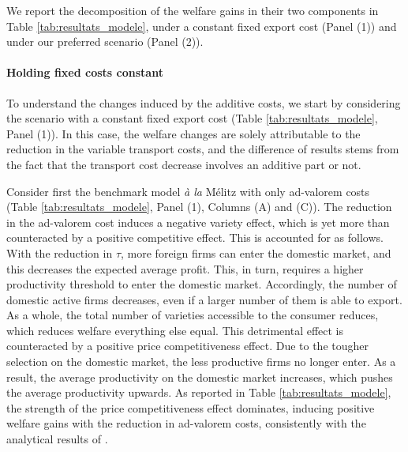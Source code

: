 \documentclass[a4paper,11pt]{article}
\begin{document}
We report the decomposition of the welfare gains in their two components in Table \ref{tab:resultats_modele}, under a constant fixed export cost (Panel (1)) and under our preferred scenario (Panel (2)). \medskip


\paragraph{Holding fixed costs constant} To understand the changes induced by the additive costs, we start by considering the scenario with a constant fixed export cost (Table  \ref{tab:resultats_modele}, Panel (1)). In this case, the welfare changes are solely attributable to the reduction in the variable transport costs, and the difference of results stems from the fact that the transport cost decrease involves an additive part or not.

Consider first the benchmark model \textit{\`{a} la} M\'{e}litz with only ad-valorem costs (Table \ref{tab:resultats_modele}, Panel (1), Columns (A) and (C)). The reduction in the ad-valorem cost induces a negative variety effect, which is yet
more than counteracted by a positive competitive effect. This is accounted for as follows. With the reduction in $\tau$, more foreign firms can enter the domestic market, and this decreases the expected average profit. This, in turn, requires a higher productivity threshold to enter the domestic
market. Accordingly, the number of domestic active firms decreases, even if a larger number
of them is able to export. As a whole, the total number of varieties accessible to the
consumer reduces, which reduces welfare everything else equal.
This detrimental effect is counteracted by a positive price competitiveness effect. Due
to the tougher selection on the domestic market, the less productive firms no longer enter.
As a result, the average productivity on the domestic market increases, which pushes
the average productivity upwards. As reported in Table \ref{tab:resultats_modele}, the strength of the price
competitiveness effect dominates, inducing positive welfare gains with the reduction in
ad-valorem costs, consistently with the analytical results of \cite{melitz}.
\end{document}

